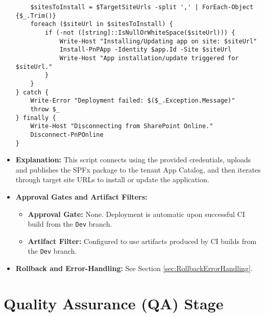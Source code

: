 \begin{itemize}
{\begin{verbatim}
    $sitesToInstall = $TargetSiteUrls -split ',' | ForEach-Object {$_.Trim()}
    foreach ($siteUrl in $sitesToInstall) {
        if (-not ([string]::IsNullOrWhiteSpace($siteUrl))) {
            Write-Host "Installing/Updating app on site: $siteUrl"
            Install-PnPApp -Identity $app.Id -Site $siteUrl
            Write-Host "App installation/update triggered for $siteUrl."
        }
    }
} catch {
    Write-Error "Deployment failed: $($_.Exception.Message)"
    throw $_ 
} finally {
    Write-Host "Disconnecting from SharePoint Online."
    Disconnect-PnPOnline
}
\end{verbatim}
    }
    \item \textbf{Explanation:} This script connects using the provided credentials, uploads and publishes the SPFx package to the tenant App Catalog, and then iterates through target site URLs to install or update the application.
    \item \textbf{Approval Gates and Artifact Filters:}
    \begin{itemize}
        \item \textbf{Approval Gate:} None. Deployment is automatic upon successful CI build from the \texttt{Dev} branch.
        \item \textbf{Artifact Filter:} Configured to use artifacts produced by CI builds from the \texttt{Dev} branch.
    \end{itemize}
    \item \textbf{Rollback and Error-Handling:} See Section \ref{sec:RollbackErrorHandling}.
\end{itemize}

\section{Quality Assurance (QA) Stage}
\label{sec:QAStage}


